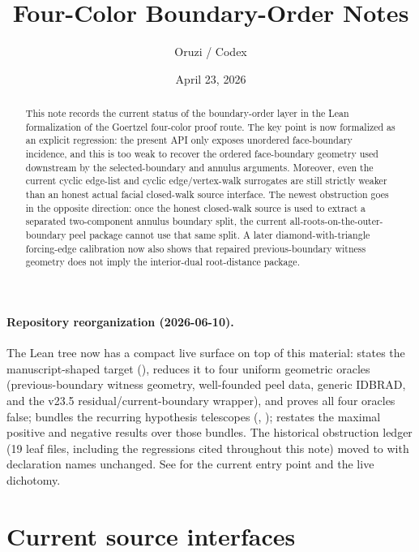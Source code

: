 \documentclass[11pt]{article}
\title{Four-Color Boundary-Order Notes}
\author{Oruzi / Codex}
\date{April 23, 2026}
\begin{document}
\maketitle
\sloppy

\begin{abstract}
This note records the current status of the boundary-order layer in the Lean
formalization of the Goertzel four-color proof route. The key point is now
formalized as an explicit regression: the present
 API only exposes unordered face-boundary
incidence, and this is too weak to recover the ordered face-boundary geometry
used downstream by the selected-boundary and annulus arguments. Moreover, even
the current cyclic edge-list and cyclic edge/vertex-walk surrogates are still
strictly weaker than an honest actual facial closed-walk source interface.
The newest obstruction goes in the opposite direction: once the honest
closed-walk source is used to extract a separated two-component annulus
boundary split, the current all-roots-on-the-outer-boundary peel package cannot
use that same split.  A later diamond-with-triangle forcing-edge calibration
now also shows that repaired previous-boundary witness geometry does not imply
the interior-dual root-distance package.
\end{abstract}

\paragraph{Repository reorganization (2026-06-10).}
The Lean tree now has a compact live surface on top of this material:
 states the manuscript-shaped target
(), reduces it to four uniform geometric oracles
(previous-boundary witness geometry, well-founded peel data, generic IDBRAD,
and the v23.5 residual/current-boundary wrapper), and proves all four oracles
false;  bundles the recurring
hypothesis telescopes (,
);  restates the maximal
positive and negative results over those bundles.  The historical obstruction
ledger (19 leaf files, including the regressions cited throughout this note)
moved to  with declaration
names unchanged.  See  for
the current entry point and the live dichotomy.

\section{Current source interfaces}
\end{document}
